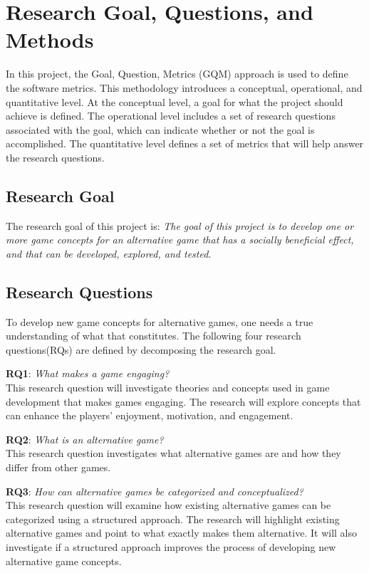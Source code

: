 \documentclass[../Main.tex]{subfiles}
\begin{document}
\section{Research Goal, Questions, and Methods}
In this project, the Goal, Question, Metrics (GQM) approach \citep{basili_software_1992} is used to define the software metrics. This methodology introduces a conceptual, operational, and quantitative level. At the conceptual level, a goal for what the project should achieve is defined. The operational level includes a set of research questions associated with the goal, which can indicate whether or not the goal is accomplished. The quantitative level defines a set of metrics that will help answer the research questions.

\subsection{Research Goal}
\label{sec:research_goal}
The research goal of this project is:
\textit{The goal of this project is to develop one or more game concepts for an alternative game that has a socially beneficial effect, and that can be developed, explored, and tested.}

\subsection{Research Questions}
\label{sec:research_questions}
To develop new game concepts for alternative games, one needs a true understanding of what that constitutes. The following four research questions(RQs) are defined by decomposing the research goal.

\textbf{RQ1}: \textit{What makes a game engaging?} \\
This research question will investigate theories and concepts used in game development that makes games engaging. The research will explore concepts that can enhance the players’ enjoyment, motivation, and engagement. 

\textbf{RQ2}: \textit{What is an alternative game?} \\
This research question investigates what alternative games are and how they differ from other games.

\textbf{RQ3}: \textit{How can alternative games be categorized and conceptualized?} \\
This research question will examine how existing alternative games can be categorized using a structured approach. The research will highlight existing alternative games and point to what exactly makes them alternative. It will also investigate if a structured approach improves the process of developing new alternative game concepts.
\end{document}
